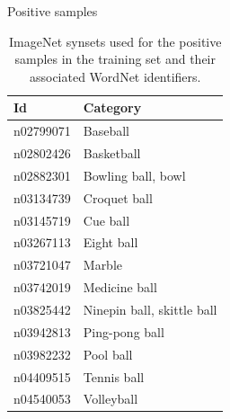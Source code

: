 \documentclass{beamer}
\begin{document}
\begin{frame}{Positive samples}
	\begin{table}[H]
		\footnotesize
		\centering
		\caption{ImageNet synsets used for the positive samples in the training set and their associated WordNet \citep{fellbaum1998wordnet} identifiers.}
		\label{tab:postraining}
		\begin{tabularx}{\textwidth}{lX}
			\toprule
			\textbf{Id} & \textbf{Category} \\
			\midrule
			n02799071 & Baseball \\
			n02802426 & Basketball \\
			n02882301 & Bowling ball, bowl \\
			n03134739 & Croquet ball \\
			n03145719 & Cue ball \\
			n03267113 & Eight ball \\
			n03721047 & Marble \\
			n03742019 & Medicine ball \\
			n03825442 & Ninepin ball, skittle ball \\
			n03942813 & Ping-pong ball \\
			n03982232 & Pool ball \\
			n04409515 & Tennis ball \\
			n04540053 & Volleyball \\
			\bottomrule
		\end{tabularx}
	\end{table}
\end{frame}
\end{document}
